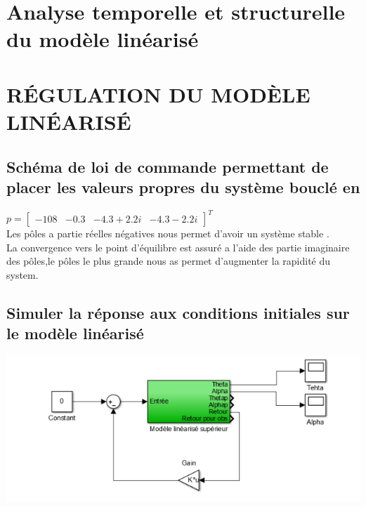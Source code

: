 \documentclass[12pt, a4paper, openany]{report}
\begin{document}
\chapter{Analyse temporelle et structurelle du modèle linéarisé }




 
\chapter{RÉGULATION DU MODÈLE LINÉARISÉ}

     \section{Schéma de loi de commande permettant de placer les valeurs propres du système bouclé en}
  $p=
  \begin{bmatrix}
  -108&-0.3&-4.3+2.2i&-4.3-2.2i
  \end{bmatrix}^{T}$\\
  
  
   Les pôles a partie  réelles négatives nous permet d'avoir un système stable .\\

   La convergence vers le point d’équilibre est  assuré a l'aide des partie imaginaire des pôles,le pôles    le plus grande nous as permet d’augmenter la rapidité du system.\\ 
   
    \section{Simuler la réponse aux conditions initiales sur le modèle linéarisé}          
       
\begin{center}
\includegraphics[scale=0.6]{simdispol.png}
\label{simdispol}
\end{center}
\end{document}
